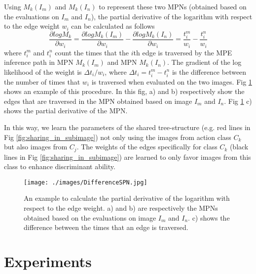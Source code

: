 \documentclass[journal]{IEEEtran}
\begin{document}
Using $ M_k(I_m) $ and $ M_k(I_n) $ to represent these two MPNs (obtained based on the evaluations on $ I_m $ and $ I_n $), the partial derivative of the logarithm with respect to the edge weight $ w_i $ can be calculated as follows
\begin{equation}\label{derivateOfWeight}
\frac{\partial logM_k}{\partial {w_i}}=\frac{\partial logM_k(I_m)}{\partial {w_i}}-\frac{\partial logM_k(I_n)}{\partial {w_i}}=\dfrac{t_i^m}{w_i}-\dfrac{t_i^n}{w_i}
\end{equation}                 
where $ t_i^m $ and  $ t_i^n $ count the times that the $ i $th edge is traversed by the MPE inference path in MPN $ M_k(I_m) $ and MPN $ M_k(I_n) $. The gradient of the log likelihood of the weight is $ \Delta t_i/w_i $, where $ \Delta t_i=t_i^m-t_i^n $ is the difference between the number of times that $ w_i $ is traversed when evaluated on the two images. Fig \ref{fig:differenceSPN} shows an example of this procedure. In this fig, a) and b) respectively show the edges that are traversed in the MPN obtained based on image $ I_m $ and $ I_n $. Fig \ref{fig:differenceSPN} c) shows the partial derivative of the MPN.

In this way, we learn the parameters of the shared tree-structure (e.g. red lines in Fig \ref{fig:sharing_in_subimage}) not only using the images from action class $ C_k $ but also images from $ C_j $. The weights of the edges specifically for class $ C_k $ (black lines in Fig \ref{fig:sharing_in_subimage})   are learned to only favor images from this class to enhance discriminant ability. 





\begin{figure}[htb]
	\begin{center}
		\texttt{[image: ./images/DifferenceSPN.jpg]}
	\end{center}
	\caption{An example to calculate the partial derivative of the logarithm with respect to the edge weight. a) and b) are respectively the MPNs obtained based on the evaluations on image $ I_m $ and $ I_n $. c) shows the difference between the times that an edge is traversed.}
	\label{fig:differenceSPN}
\end{figure}




\section{Experiments}
\label{Sec:experi}
\end{document}
